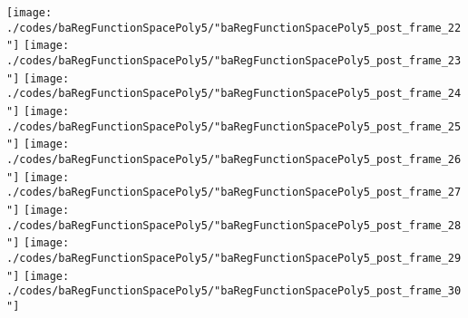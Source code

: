 \begin{frame}{\insertsection}
\begin{center}
{\begin{animateinline}{15}
				 \texttt{[image: ./codes/baRegFunctionSpacePoly5/"baRegFunctionSpacePoly5\_post\_frame\_22"]}\newframe
				 \texttt{[image: ./codes/baRegFunctionSpacePoly5/"baRegFunctionSpacePoly5\_post\_frame\_23"]}\newframe
				 \texttt{[image: ./codes/baRegFunctionSpacePoly5/"baRegFunctionSpacePoly5\_post\_frame\_24"]}\newframe
				 \texttt{[image: ./codes/baRegFunctionSpacePoly5/"baRegFunctionSpacePoly5\_post\_frame\_25"]}\newframe
				 \texttt{[image: ./codes/baRegFunctionSpacePoly5/"baRegFunctionSpacePoly5\_post\_frame\_26"]}\newframe
				 \texttt{[image: ./codes/baRegFunctionSpacePoly5/"baRegFunctionSpacePoly5\_post\_frame\_27"]}\newframe
				 \texttt{[image: ./codes/baRegFunctionSpacePoly5/"baRegFunctionSpacePoly5\_post\_frame\_28"]}\newframe
				 \texttt{[image: ./codes/baRegFunctionSpacePoly5/"baRegFunctionSpacePoly5\_post\_frame\_29"]}\newframe
				 \texttt{[image: ./codes/baRegFunctionSpacePoly5/"baRegFunctionSpacePoly5\_post\_frame\_30"]}
			 \end{animateinline}
			}
	\end{center}
    
\end{frame}


